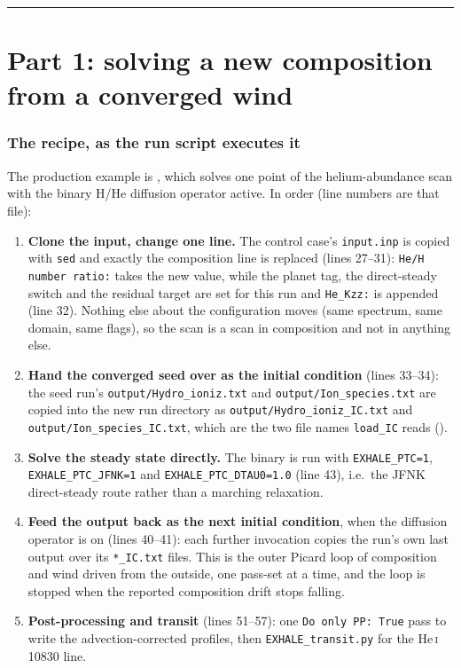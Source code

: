 \documentclass[english,a4paper]{my_memo}
\begin{document}
\bigskip
\hrule

\part*{Part 1: solving a new composition from a converged wind}

\section{The recipe, as the run script executes it}
\label{sec:recipe}

The production example is , which
solves one point of the helium-abundance scan with the binary H/He diffusion
operator active. In order (line numbers are that file):

\begin{enumerate}
\item \textbf{Clone the input, change one line.} The control case's
  \verb|input.inp| is copied with \verb|sed| and exactly the composition
  line is replaced (lines 27--31):
  \verb|He/H number ratio:| takes the new value, while the planet tag, the
  direct-steady switch and the residual target are set for this run and
  \verb|He_Kzz:| is appended (line 32). Nothing else about the
  configuration moves (same spectrum, same domain, same flags), so the
  scan is a scan in composition and not in anything else.
\item \textbf{Hand the converged seed over as the initial condition}
  (lines 33--34): the seed run's \verb|output/Hydro_ioniz.txt| and
  \verb|output/Ion_species.txt| are copied into the new run directory as
  \verb|output/Hydro_ioniz_IC.txt| and \verb|output/Ion_species_IC.txt|,
  which are the two file names \verb|load_IC| reads
  ().
\item \textbf{Solve the steady state directly.} The binary is run with
  \verb|EXHALE_PTC=1|, \verb|EXHALE_PTC_JFNK=1| and
  \verb|EXHALE_PTC_DTAU0=1.0| (line 43), i.e.\ the JFNK direct-steady route
  rather than a marching relaxation.
\item \textbf{Feed the output back as the next initial condition}, when the
  diffusion operator is on (lines 40--41): each further invocation copies
  the run's own last output over its \verb|*_IC.txt| files. This is the
  outer Picard loop of composition and wind driven from the outside, one
  pass-set at a time, and the loop is stopped when the reported composition
  drift stops falling.
\item \textbf{Post-processing and transit} (lines 51--57): one
  \verb|Do only PP: True| pass to write the advection-corrected profiles,
  then \verb|EXHALE_transit.py| for the He\,\textsc{i} 10830 line.
\end{enumerate}
\end{document}
